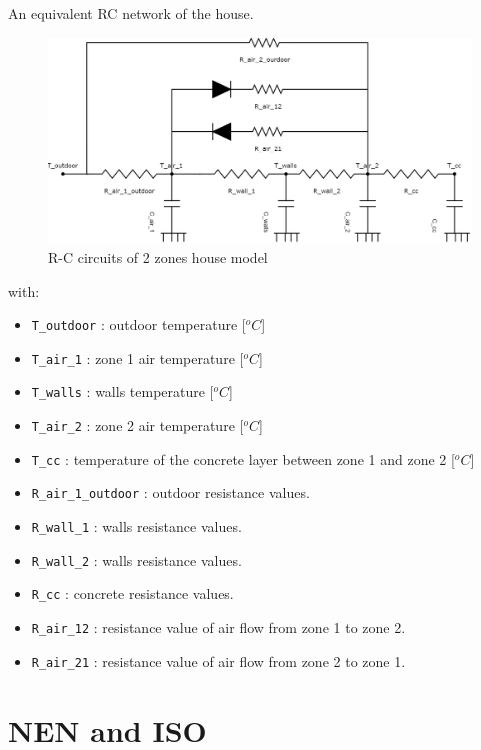 \documentclass[a4paper,10pt]{article}
\begin{document}
An equivalent RC network of the house.

\begin{figure}[H]
	\centering
	\includegraphics[width=1.0\columnwidth]{Pictures/2_Zones_house_circuits.png}
	\caption[Short title]{R-C circuits of 2 zones house model}
	\label{row house}
	\end{figure}

with:\\
\begin{itemize}
    \item \texttt{T\_outdoor} : outdoor temperature [$^oC$]
    \item \texttt{T\_air\_1}  : zone 1 air temperature [$^oC$]
    \item \texttt{T\_walls}   : walls temperature [$^oC$]
    \item \texttt{T\_air\_2}  : zone 2 air temperature [$^oC$]
    \item \texttt{T\_cc}      : temperature of the concrete layer between zone 1 and zone 2 [$^oC$]
    \item \texttt{R\_air\_1\_outdoor} : outdoor resistance values.
    \item \texttt{R\_wall\_1} : walls resistance values.
    \item \texttt{R\_wall\_2} : walls resistance values.
    \item \texttt{R\_cc}      : concrete resistance values.
    \item \texttt{R\_air\_12} : resistance value of air flow from zone 1 to zone 2.
    \item \texttt{R\_air\_21} : resistance value of air flow from zone 2 to zone 1.

\end{itemize}
\newpage

\section{NEN and ISO}
\end{document}
